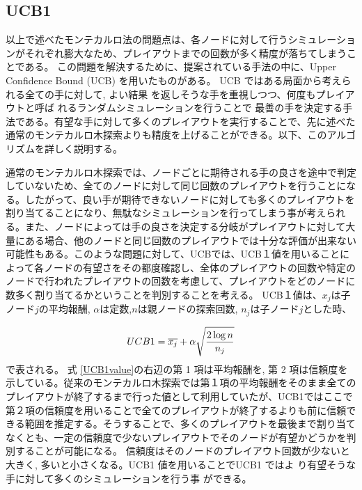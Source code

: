\subsection{UCB1}
以上で述べたモンテカルロ法の問題点は、各ノードに対して行うシミュレーションがそれぞれ膨大なため、プレイアウトまでの回数が多く精度が落ちてしまうことである。
この問題を解決するために、提案されている手法の中に、Upper Confidence Bound (UCB) \cite{UCB}を用いたものがある。
UCB ではある局面から考えられる全ての手に対して, よい結果 を返しそうな手を重視しつつ、何度もプレイアウトと呼ば れるランダムシミュレーションを行うことで 最善の手を決定する手法である。有望な手に対して多くのプレイアウトを実行することで、先に述べた通常のモンテカルロ木探索よりも精度を上げることができる。以下、このアルゴリズムを詳しく説明する。

通常のモンテカルロ木探索では、ノードごとに期待される手の良さを途中で判定していないため、全てのノードに対して同じ回数のプレイアウトを行うことになる。したがって、良い手が期待できないノードに対しても多くのプレイアウトを割り当てることになり、無駄なシミュレーションを行ってしまう事が考えられる。また、ノードによっては手の良さを決定する分岐がプレイアウトに対して大量にある場合、他のノードと同じ回数のプレイアウトでは十分な評価が出来ない可能性もある。このような問題に対して、UCBでは、UCB１値を用いることによって各ノードの有望さをその都度確認し、全体のプレイアウトの回数や特定のノードで行われたプレイアウトの回数を考慮して、プレイアウトをどのノードに数多く割り当てるかということを判別することを考える。
UCB１値は、${x_{j}}$は子ノード$j$の平均報酬, $α$は定数,$n$は親ノードの探索回数, ${n_{j}}$は子ノード$j$とした時、

\begin{equation}
\label{UCB1value}
\Large UCB1 = \overline {x_{j}}+\alpha \sqrt {\displaystyle \frac {2\log{n}} {n_{j}}}
\end{equation}
で表される。
式 \ref{UCB1value}の右辺の第 1 項は平均報酬を, 第 2 項は信頼度を示している。従来のモンテカルロ木探索では第１項の平均報酬をそのまま全てのプレイアウトが終了するまで行った値として利用していたが、UCB1ではここで第２項の信頼度を用いることで全てのプレイアウトが終了するよりも前に信頼できる範囲を推定する。そうすることで、多くのプレイアウトを最後まで割り当てなくとも、一定の信頼度で少ないプレイアウトでそのノードが有望かどうかを判別することが可能になる。
信頼度はそのノードのプレイアウト回数が少ないと大きく, 多いと小さくなる。UCB1 値を用いることでUCB1 ではよ り有望そうな手に対して多くのシミュレーションを行う事 ができる。

